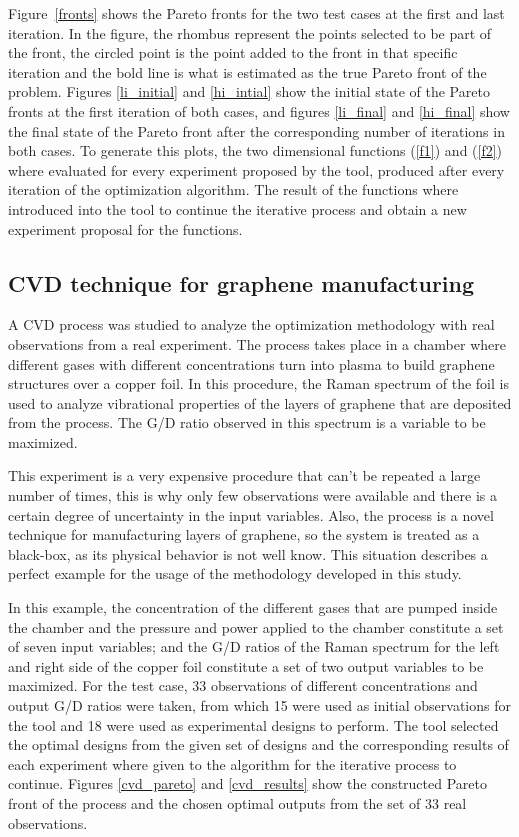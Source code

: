 \documentclass{article}
\begin{document}
Figure~\ref{fronts} shows the Pareto fronts for the two test cases at the first and last iteration. In the figure, the rhombus represent the points selected to be part of the front, the circled point is the point added to the front in that specific iteration and the bold line is what is estimated as the true Pareto front of the problem. Figures \ref{li_initial} and \ref{hi_intial} show the initial state of the Pareto fronts at the first iteration of both cases, and figures \ref{li_final} and \ref{hi_final} show the final state of the Pareto front after the corresponding number of iterations in both cases. To generate this plots, the two dimensional functions (\ref{f1}) and (\ref{f2}) where evaluated for every experiment proposed by the tool, produced after every iteration of the optimization algorithm. The result of the functions where introduced into the tool to continue the iterative process and obtain a new experiment proposal for the functions.

\subsection{CVD technique for graphene manufacturing}

A CVD process was studied to analyze the optimization methodology with real observations from a real experiment. The process takes place in a chamber where different gases with different concentrations turn into plasma to build graphene structures over a copper foil. In this procedure, the Raman spectrum of the foil is used to analyze vibrational properties of the layers of graphene that are deposited from the process. The G/D ratio observed in this spectrum is a variable to be maximized.

This experiment is a very expensive procedure that can't be repeated a large number of times, this is why only few observations were available and there is a certain degree of uncertainty in the input variables. Also, the process is a novel technique for manufacturing layers of graphene, so the system is treated as a black-box, as its physical behavior is not well know. This situation describes a perfect example for the usage of the methodology developed in this study.

In this example, the concentration of the different gases that are pumped inside the chamber and the pressure and power applied to the chamber constitute a set of seven input variables; and the G/D ratios of the Raman spectrum for the left and right side of the copper foil constitute a set of two output variables to be maximized. For the test case, 33 observations of different concentrations and output G/D ratios were taken, from which 15 were used as initial observations for the tool and 18 were used as experimental designs to perform. The tool selected the optimal designs from the given set of designs and the corresponding results of each experiment where given to the algorithm for the iterative process to continue. Figures \ref{cvd_pareto} and \ref{cvd_results} show the constructed Pareto front of the process and the chosen optimal outputs from the set of 33 real observations.
\end{document}
